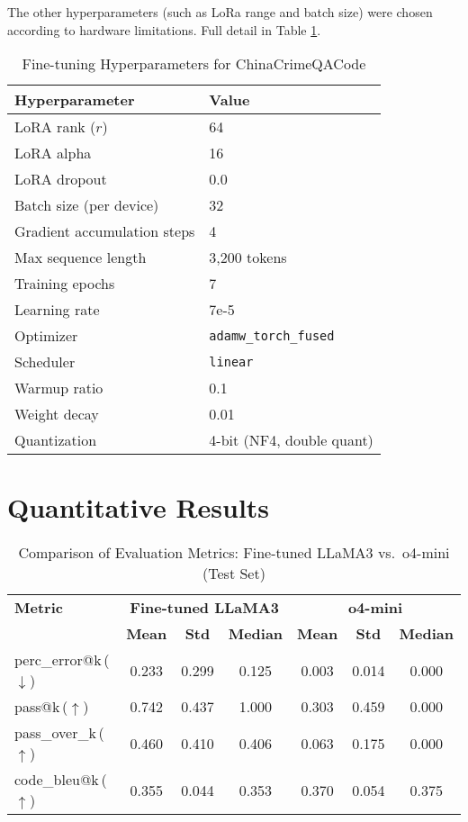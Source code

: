 The other hyperparameters (such as LoRa range and batch size) were chosen according to hardware limitations. Full detail in Table \ref{tab:hyperparameters}.

\begin{table}[H]
\centering
\caption{Fine-tuning Hyperparameters for ChinaCrimeQACode}
\label{tab:hyperparameters}
\begin{tabular}{ll}
\toprule
\textbf{Hyperparameter} & \textbf{Value} \\
\midrule
LoRA rank ($r$) & 64 \\
LoRA alpha & 16 \\
LoRA dropout & 0.0 \\
Batch size (per device) & 32 \\
Gradient accumulation steps & 4 \\
Max sequence length & 3,200 tokens \\
Training epochs & 7 \\
Learning rate & 7e-5 \\
Optimizer & \texttt{adamw\_torch\_fused} \\
Scheduler & \texttt{linear} \\
Warmup ratio & 0.1 \\
Weight decay & 0.01 \\
Quantization & 4-bit (NF4, double quant) \\
\bottomrule
\end{tabular}
\end{table}

\section{Quantitative Results}

\begin{table}[H]
\centering
\caption{Comparison of Evaluation Metrics: Fine-tuned LLaMA3 vs.\ o4-mini (Test Set)}
{%
\begin{tabular}{l|ccc|ccc}
\toprule
\textbf{Metric} & \multicolumn{3}{c|}{\textbf{Fine-tuned LLaMA3}} & \multicolumn{3}{c}{\textbf{o4-mini}} \\
\cmidrule(lr){2-4} \cmidrule(lr){5-7}
 & \textbf{Mean} & \textbf{Std} & \textbf{Median} & \textbf{Mean} & \textbf{Std} & \textbf{Median} \\
\midrule
perc\_error@k\,($\downarrow$)  & 0.233 & 0.299 & 0.125 & 0.003 & 0.014 & 0.000 \\
pass@k\,($\uparrow$)           & 0.742 & 0.437 & 1.000 & 0.303 & 0.459 & 0.000 \\
pass\_over\_k\,($\uparrow$)     & 0.460 & 0.410 & 0.406 & 0.063 & 0.175 & 0.000 \\
code\_bleu@k\,($\uparrow$)     & 0.355 & 0.044 & 0.353 & 0.370 & 0.054 & 0.375 \\
\bottomrule
\end{tabular}
}
\label{tab:combined_metrics}
\end{table}

